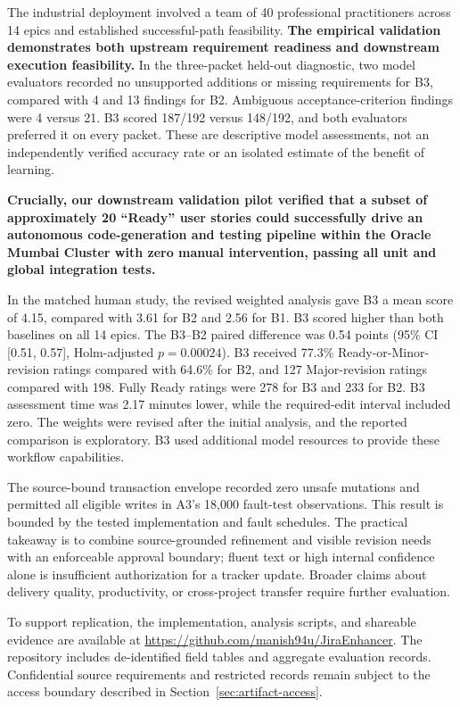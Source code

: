 \documentclass[manuscript,review]{acmart}
\begin{document}
The industrial deployment involved a team of 40 professional practitioners across 14 epics and established successful-path feasibility. \textbf{The empirical validation demonstrates both upstream requirement readiness and downstream execution feasibility.} In the three-packet held-out diagnostic, two model evaluators recorded no unsupported additions or missing requirements for B3, compared with 4 and 13 findings for B2. Ambiguous acceptance-criterion findings were 4 versus 21. B3 scored 187/192 versus 148/192, and both evaluators preferred it on every packet. These are descriptive model assessments, not an independently verified accuracy rate or an isolated estimate of the benefit of learning.

\textbf{Crucially, our downstream validation pilot verified that a subset of approximately 20 ``Ready'' user stories could successfully drive an autonomous code-generation and testing pipeline within the Oracle Mumbai Cluster with zero manual intervention, passing all unit and global integration tests.}

In the matched human study, the revised weighted analysis gave B3 a mean score of 4.15, compared with 3.61 for B2 and 2.56 for B1. B3 scored higher than both baselines on all 14 epics. The B3--B2 paired difference was 0.54 points (95\% CI [0.51, 0.57], Holm-adjusted $p=0.00024$). B3 received 77.3\% Ready-or-Minor-revision ratings compared with 64.6\% for B2, and 127 Major-revision ratings compared with 198. Fully Ready ratings were 278 for B3 and 233 for B2. B3 assessment time was 2.17 minutes lower, while the required-edit interval included zero. The weights were revised after the initial analysis, and the reported comparison is exploratory. B3 used additional model resources to provide these workflow capabilities.

The source-bound transaction envelope recorded zero unsafe mutations and permitted all eligible writes in A3's 18,000 fault-test observations. This result is bounded by the tested implementation and fault schedules. The practical takeaway is to combine source-grounded refinement and visible revision needs with an enforceable approval boundary; fluent text or high internal confidence alone is insufficient authorization for a tracker update. Broader claims about delivery quality, productivity, or cross-project transfer require further evaluation.

To support replication, the implementation, analysis scripts, and shareable evidence are available at \url{https://github.com/manish94u/JiraEnhancer}. The repository includes de-identified field tables and aggregate evaluation records. Confidential source requirements and restricted records remain subject to the access boundary described in Section~\ref{sec:artifact-access}.
\end{document}
